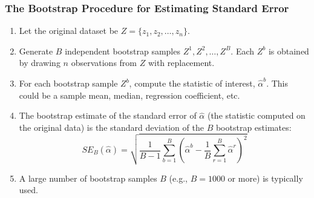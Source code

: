 \documentclass[12pt,a4paper]{article}
\begin{document}
\begin{itemize}
\begin{itemize}
\begin{itemize}
    \subsubsection{The Bootstrap Procedure for Estimating Standard Error}
        \begin{enumerate}
            \item Let the original dataset be $Z = \{z_1, z_2, \dots, z_n\}$.
            \item Generate $B$ independent bootstrap samples $Z^{1}, Z^{2}, \dots, Z^{B}$. Each $Z^{b}$ is obtained by drawing $n$ observations from $Z$ with replacement.
            \item For each bootstrap sample $Z^{b}$, compute the statistic of interest, $\hat{\alpha}^{b}$. This could be a sample mean, median, regression coefficient, etc.
            \item The bootstrap estimate of the standard error of $\hat{\alpha}$ (the statistic computed on the original data) is the standard deviation of the $B$ bootstrap estimates:
                $$ SE_B(\hat{\alpha}) = \sqrt{\frac{1}{B-1} \sum_{b=1}^{B} \left(\hat{\alpha}^{b} - \frac{1}{B}\sum_{r=1}^{B}\hat{\alpha}^{r}\right)^2} $$
            \item A large number of bootstrap samples $B$ (e.g., $B=1000$ or more) is typically used.
        \end{enumerate}


\end{itemize}
\end{itemize}
\end{itemize}
\end{document}
